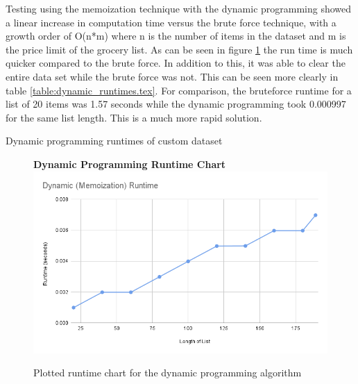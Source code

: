 \documentclass[10pt,journal,compsoc]{IEEEtran}
\begin{document}
Testing using the memoization technique with the dynamic programming showed a
linear increase in computation time versus the brute force technique, with a
growth order of O(n*m) where n is the number of items in the dataset and m is
the price limit of the grocery list. As can be seen in figure
\ref{fig:dynamic_timecomplexity.png} the run time is much quicker compared to
the brute force. In addition to this, it was able to clear the entire data set
while the brute force was not. This can be seen more clearly in table
\ref{table:dynamic_runtimes.tex}. For comparison, the bruteforce runtime for a
list of 20 items was 1.57 seconds while the dynamic programming took 0.000997
for the same list length. This is a much more rapid solution.

\begin{table}[h]
    \setlength\tabcolsep{2pt}
    \centering
    
    \caption{Dynamic programming runtimes of custom dataset}
    \label{table:dynamic_runtimes.tex}
\end{table}

\begin{figure}[h]
    \centering
    \textbf{Dynamic Programming Runtime Chart}
    \includegraphics[width=\columnwidth]{assets/dynamic_runtime.png}
    \caption{Plotted runtime chart for the dynamic programming algorithm}
    \label{fig:dynamic_timecomplexity.png}
\end{figure}
\end{document}
